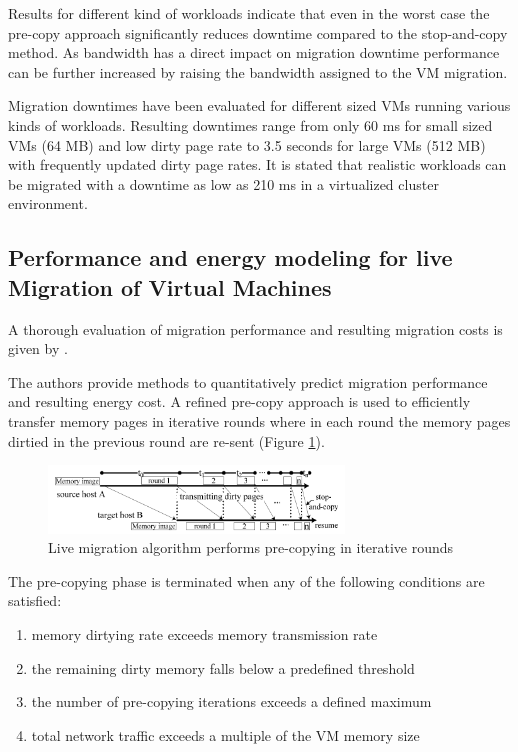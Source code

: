 Results for different kind of workloads indicate that even in the worst case the pre-copy approach significantly reduces downtime compared to the stop-and-copy method. As bandwidth has a direct impact on migration downtime performance can be further increased by raising the bandwidth assigned to the VM migration. 

Migration downtimes have been evaluated for different sized VMs running various kinds of workloads. Resulting downtimes range from only 60 ms for small sized VMs (64 MB) and low dirty page rate to 3.5 seconds for large VMs (512 MB) with frequently updated dirty page rates. It is stated that realistic workloads can be migrated with a downtime as low as 210 ms in a virtualized cluster environment. 


\subsection{Performance and energy modeling for live Migration of Virtual Machines}

A thorough evaluation of migration performance and resulting migration costs is given by \cite{liu2013performance}. 

The authors provide methods to quantitatively predict migration performance and resulting energy cost. A refined pre-copy approach is used to efficiently transfer memory pages in iterative rounds where in each round the memory pages dirtied in the previous round are re-sent (Figure \ref{fig:VM_migration_precopy}). 

\begin{figure}[htbp]
	\centering
		\includegraphics[width=0.7\textwidth]{figures/state_of_the_art/VM_migration_precopy.PNG}
	\caption{Live migration algorithm performs pre-copying in iterative rounds \cite{liu2013performance}}
	\label{fig:VM_migration_precopy}
\end{figure}

The pre-copying phase is terminated when any of the following conditions are satisfied:

\begin{enumerate}
	\item [1)] memory dirtying rate exceeds memory transmission rate
	\item [2)] the remaining dirty memory falls below a predefined threshold
	\item [3)] the number of pre-copying iterations exceeds a defined maximum
	\item [4)] total network traffic exceeds a multiple of the VM memory size
\end{enumerate}

